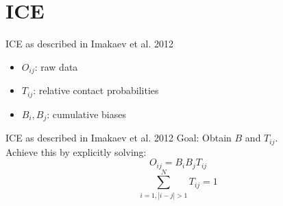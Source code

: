\section{ICE}



\begin{frame}[c]{ICE as described in Imakaev et al. 2012 \cite{imakaev2012iterative}}
    \Large
    \begin{itemize}[<+(1)->]
        \item $O_{ij}$: raw data
        \item $T_{ij}$: relative contact probabilities
        \item $B_i, B_j$: cumulative biases
    \end{itemize}
\end{frame}

\begin{frame}[c]{ICE as described in Imakaev et al. 2012 \cite{imakaev2012iterative}}
    \Large
    Goal: Obtain $B$ and $T_{ij}$. \\ \pause Achieve this by explicitly solving:
    \begin{equation} \label{eq:1}
    O_{ij} = B_i B_j T_{ij}
    \end{equation}
    \begin{equation} \label{eq:2}
    \sum^N_{i=1, |i-j|>1} T_{ij} = 1
    \end{equation}
\end{frame}

